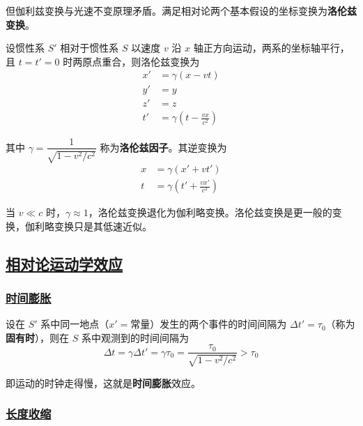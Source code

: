 但伽利兹变换与光速不变原理矛盾。满足相对论两个基本假设的坐标变换为\textbf{洛伦兹变换}。

设惯性系 $S'$ 相对于惯性系 $S$ 以速度 $v$ 沿 $x$ 轴正方向运动，两系的坐标轴平行，且 $t = t' = 0$ 时两原点重合，则洛伦兹变换为
\begin{align}
    x' &= \gamma(x - vt) \\
    y' &= y \\
    z' &= z \\
    t' &= \gamma\left(t - \frac{vx}{c^2}\right)
\end{align}

其中 $\gamma = \dfrac{1}{\sqrt{1 - v^2/c^2}}$ 称为\textbf{洛伦兹因子}。其逆变换为
\begin{align}
    x &= \gamma(x' + vt') \\
    t &= \gamma\left(t' + \frac{vx'}{c^2}\right)
\end{align}

\begin{remark}
    当 $v \ll c$ 时，$\gamma \approx 1$，洛伦兹变换退化为伽利略变换。洛伦兹变换是更一般的变换，伽利略变换只是其低速近似。
\end{remark}

\subsection{\protect\hyperlink{:}{相对论运动学效应}}

\subsubsection{\protect\hyperlink{:}{时间膨胀}}

设在 $S'$ 系中同一地点（$x' = \text{常量}$）发生的两个事件的时间间隔为 $\Delta t' = \tau_0$（称为\textbf{固有时}），则在 $S$ 系中观测到的时间间隔为
\begin{equation}
    \Delta t = \gamma \Delta t' = \gamma \tau_0 = \frac{\tau_0}{\sqrt{1 - v^2/c^2}} > \tau_0
\end{equation}

即运动的时钟走得慢，这就是\textbf{时间膨胀}效应。

\subsubsection{\protect\hyperlink{:}{长度收缩}}

